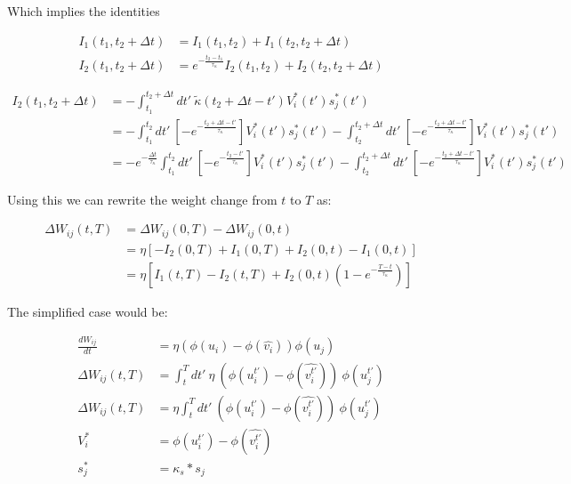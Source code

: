 Which implies the identities

\begin{align}
  I_1(t_1, t_2 + \Delta t) & = I_1 (t_1, t_2) + I_1 (t_2, t_2 + \Delta t)                                       \\
  I_2(t_1, t_2 + \Delta t) & = e^{- \frac{t_2 - t_1}{\tau_{\kappa}}} I_2 (t_1, t_2) + I_2 (t_2, t_2 + \Delta t)
\end{align}


\begin{align}
  I_2 (t_1, t_2 + \Delta t) & = -\int_{t_1}^{t_2 + \Delta t} dt' \ \tilde{\kappa} (t_2 + \Delta t - t') V_i^\ast (t') s_j^\ast (t')                                        \\
                            & = -\int_{t_1}^{t_2} dt' \ \left[ -e^{- \frac{t_2 + \Delta t - t'}{\tau_\kappa}} \right] V_i^\ast (t') s_j^\ast (t')
  -\int_{t_2}^{t_2 + \Delta t} dt' \ \left[ -e^{- \frac{t_2 + \Delta t - t'}{\tau_\kappa}} \right] V_i^\ast (t') s_j^\ast (t')                                             \\
                            & = -e^{- \frac{ \Delta t}{\tau_\kappa}} \int_{t_1}^{t_2} dt' \ \left[ -e^{- \frac{t_2 - t'}{\tau_\kappa}} \right] V_i^\ast (t') s_j^\ast (t')
  -\int_{t_2}^{t_2 + \Delta t} dt' \ \left[ -e^{- \frac{t_2 + \Delta t - t'}{\tau_\kappa}} \right] V_i^\ast (t') s_j^\ast (t')
\end{align}


Using this we can rewrite the weight change from $t$ to $T$ as:


\begin{align}
  \Delta W_{ij}(t,T) & = \Delta W_{ij}(0,T) - \Delta W_{ij}(0,t)                                               \\
                     & = \eta [-I_2(0,T) + I_1(0,T) + I_2(0,t) - I_1(0,t)]                                     \\
                     & = \eta [I_1(t,T) - I_2(t,T) + I_2(0,t)\left( 1 - e^{- \frac{T-t}{\tau_\kappa}} \right)]
\end{align}

The simplified \cite{sacramento2018dendritic} case would be:

\begin{align}
  \frac{dW_{ij}}{dt} & = \eta (\phi(u_i) - \phi(\hat{v_i})) \phi(u_j)                                         \\
  \Delta W_{ij}(t,T) & = \int_t^T dt' \ \eta \  (\phi(u_i^{t'}) - \phi(\widehat{v_i^{t'}})) \  \phi(u_j^{t'}) \\
  \Delta W_{ij}(t,T) & = \eta \int_t^T dt' \  (\phi(u_i^{t'}) - \phi(\widehat{v_i^{t'}})) \ \phi(u_j^{t'})    \\
  V_i^*              & = \phi(u_i^{t'}) - \phi(\widehat{v_i^{t'}})                                            \\
  s_j^*              & = \kappa_s * s_j
\end{align}


